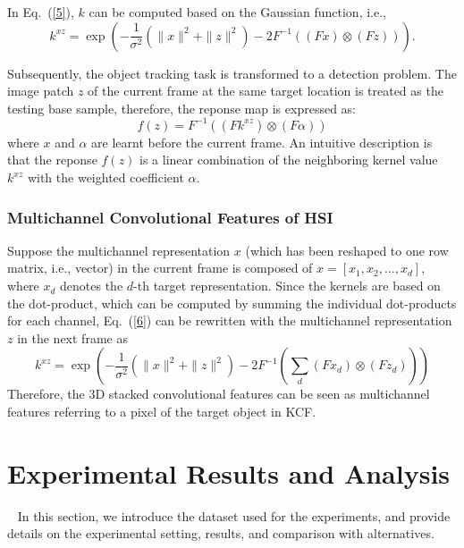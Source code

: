 \documentclass[runningheads,a4paper]{llncs}
\begin{document}
In Eq.~(\ref{5}), $k$ can be computed based on the Gaussian function, i.e.,
\begin{equation}\label{6}
k^{xz}=\exp(-\frac{1}{\sigma^2}(\|x\|^2+\|z\|^2)-2F^{-1}((Fx) \otimes (Fz ))).
\end{equation}

Subsequently, the object tracking task is transformed to a detection problem. The image patch $z$ of the current frame at the same target location is treated as the testing base sample, therefore, the reponse map is expressed as:
\begin{equation}\label{7}
f(z)=F^{-1}((Fk^{xz})\otimes (F{\alpha}))
\end{equation}
where $x$ and $\alpha$ are learnt before the current frame. An intuitive description is that the reponse $f(z)$ is a linear combination of the neighboring kernel value $k^{xz}$ with the weighted coefficient $\alpha$.

\subsubsection{Multichannel Convolutional Features of HSI}
Suppose the multichannel representation $x$ (which has been reshaped to one row matrix, i.e., vector) in the current frame is composed of $x=[x_1,x_2,...,x_d]$, where $x_d$ denotes the $d$-th target representation. Since the kernels are based on the dot-product, which can be computed by summing the individual dot-products for each channel, Eq.~(\ref{6}) can be rewritten with the multichannel representation $z$ in the next frame as
\begin{equation}\label{8}
k^{xz}=\exp(-\frac{1}{\sigma^2}(\|x\|^2+\|z\|^2)-2F^{-1}(\sum_{d}(F{x_d}) \otimes (Fz_d)  ))
\end{equation}
Therefore, the 3D stacked convolutional features can be seen as multichannel features referring to a pixel of the target object in KCF.

\section{Experimental Results and Analysis}~\label{sec:experiments}
In this section, we introduce the dataset used for the experiments, and provide details on the experimental setting, results, and comparison with alternatives.
\end{document}
